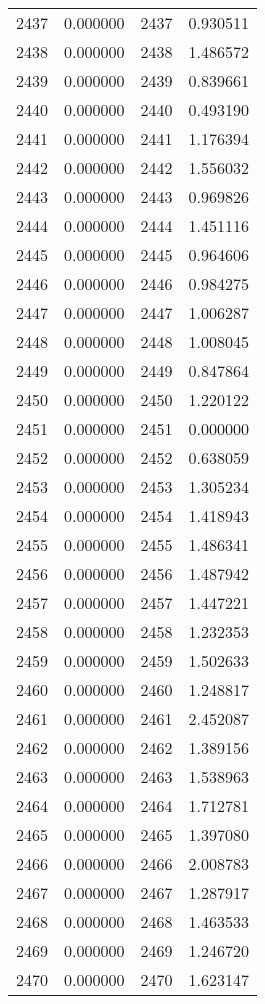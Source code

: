 \documentclass[12pt]{article}
\begin{document}
\begin{longtable}{@{}cccc@{}}
2437 & 0.000000 & 2437 & 0.930511 \\
2438 & 0.000000 & 2438 & 1.486572 \\
2439 & 0.000000 & 2439 & 0.839661 \\
2440 & 0.000000 & 2440 & 0.493190 \\
2441 & 0.000000 & 2441 & 1.176394 \\
2442 & 0.000000 & 2442 & 1.556032 \\
2443 & 0.000000 & 2443 & 0.969826 \\
2444 & 0.000000 & 2444 & 1.451116 \\
2445 & 0.000000 & 2445 & 0.964606 \\
2446 & 0.000000 & 2446 & 0.984275 \\
2447 & 0.000000 & 2447 & 1.006287 \\
2448 & 0.000000 & 2448 & 1.008045 \\
2449 & 0.000000 & 2449 & 0.847864 \\
2450 & 0.000000 & 2450 & 1.220122 \\
2451 & 0.000000 & 2451 & 0.000000 \\
2452 & 0.000000 & 2452 & 0.638059 \\
2453 & 0.000000 & 2453 & 1.305234 \\
2454 & 0.000000 & 2454 & 1.418943 \\
2455 & 0.000000 & 2455 & 1.486341 \\
2456 & 0.000000 & 2456 & 1.487942 \\
2457 & 0.000000 & 2457 & 1.447221 \\
2458 & 0.000000 & 2458 & 1.232353 \\
2459 & 0.000000 & 2459 & 1.502633 \\
2460 & 0.000000 & 2460 & 1.248817 \\
2461 & 0.000000 & 2461 & 2.452087 \\
2462 & 0.000000 & 2462 & 1.389156 \\
2463 & 0.000000 & 2463 & 1.538963 \\
2464 & 0.000000 & 2464 & 1.712781 \\
2465 & 0.000000 & 2465 & 1.397080 \\
2466 & 0.000000 & 2466 & 2.008783 \\
2467 & 0.000000 & 2467 & 1.287917 \\
2468 & 0.000000 & 2468 & 1.463533 \\
2469 & 0.000000 & 2469 & 1.246720 \\
2470 & 0.000000 & 2470 & 1.623147 \\

\end{longtable}
\end{document}
